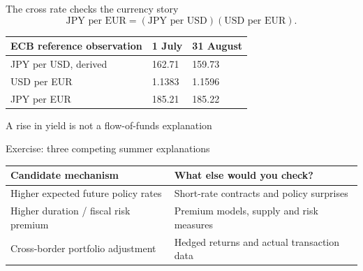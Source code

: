 \documentclass[12pt,aspectratio=169]{beamer}
\begin{document}

\begin{frame}{The cross rate checks the currency story}
\[\text{JPY per EUR}=(\text{JPY per USD})(\text{USD per EUR}).\]\begin{center}\begin{tabular}{@{}lll@{}}\toprule \textbf{ECB reference observation} & \textbf{1 July} & \textbf{31 August}\\\midrule JPY per USD, derived & 162.71 & 159.73\\[2mm]
USD per EUR & 1.1383 & 1.1596\\[2mm]
JPY per EUR & 185.21 & 185.22\\\bottomrule\end{tabular}\end{center}
\end{frame}


\begin{frame}{A rise in yield is not a flow-of-funds explanation}
\end{frame}


\begin{frame}{Exercise: three competing summer explanations}
\begin{center}\begin{tabular}{@{}p{}p{}@{}}\toprule \textbf{Candidate mechanism} & \textbf{What else would you check?}\\\midrule Higher expected future policy rates & Short-rate contracts and policy surprises\\[2mm]
Higher duration / fiscal risk premium & Premium models, supply and risk measures\\[2mm]
Cross-border portfolio adjustment & Hedged returns and actual transaction data\\\bottomrule\end{tabular}\end{center}
\end{frame}
\end{document}
